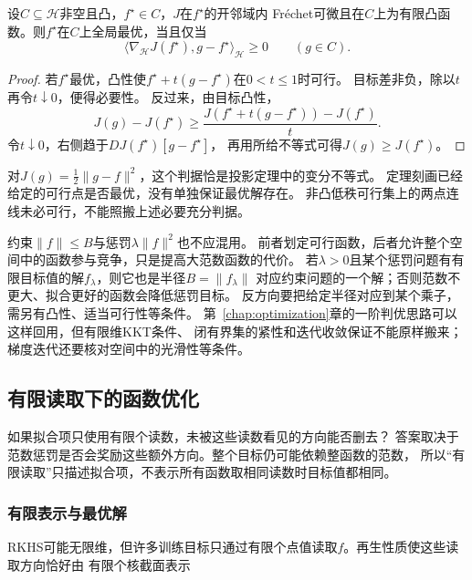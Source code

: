 \begin{theorem}[凸函数优化的一阶判据]
\label{thm:functional-convex-optimality}
设$C\subseteq\mathcal H$非空且凸，$f^\star\in C$，$J$在$f^\star$的开邻域内
Fréchet可微且在$C$上为有限凸函数。则$f^\star$在$C$上全局最优，当且仅当
\begin{equation}
 \langle\nabla_{\mathcal H}J(f^\star),g-f^\star\rangle_{\mathcal H}\geq0
 \qquad(g\in C).
 \label{eq:functional-convex-optimality}
\end{equation}
\end{theorem}
\begin{proof}
若$f^\star$最优，凸性使$f^\star+t(g-f^\star)$在$0<t\leq1$时可行。
目标差非负，除以$t$再令$t\downarrow0$，便得必要性。
反过来，由目标凸性，
\[
 J(g)-J(f^\star)\geq
 \frac{J(f^\star+t(g-f^\star))-J(f^\star)}{t}.
\]
令$t\downarrow0$，右侧趋于$DJ(f^\star)[g-f^\star]$，
再用所给不等式可得$J(g)\geq J(f^\star)$。
\end{proof}
对$J(g)=\frac12\lVert g-f\rVert^2$，这个判据恰是投影定理中的变分不等式。
定理刻画已经给定的可行点是否最优，没有单独保证最优解存在。
非凸低秩可行集上的两点连线未必可行，不能照搬上述必要充分判据。

约束$\lVert f\rVert\leq B$与惩罚$\lambda\lVert f\rVert^2$也不应混用。
前者划定可行函数，后者允许整个空间中的函数参与竞争，只是提高大范数函数的代价。
若$\lambda>0$且某个惩罚问题有有限目标值的解$f_\lambda$，则它也是半径$B=\lVert f_\lambda\rVert$
对应约束问题的一个解；否则范数不更大、拟合更好的函数会降低惩罚目标。
反方向要把给定半径对应到某个乘子，需另有凸性、适当可行性等条件。
第~\ref{chap:optimization}章的一阶判优思路可以这样回用，但有限维KKT条件、
闭有界集的紧性和迭代收敛保证不能原样搬来；梯度迭代还要核对空间中的光滑性等条件。

\subsection{有限读取下的函数优化}

如果拟合项只使用有限个读数，未被这些读数看见的方向能否删去？
答案取决于范数惩罚是否会奖励这些额外方向。整个目标仍可能依赖整函数的范数，
所以“有限读取”只描述拟合项，不表示所有函数取相同读数时目标值都相同。

\subsubsection{有限表示与最优解}

RKHS可能无限维，但许多训练目标只通过有限个点值读取$f$。再生性质使这些读取方向恰好由
有限个核截面表示

